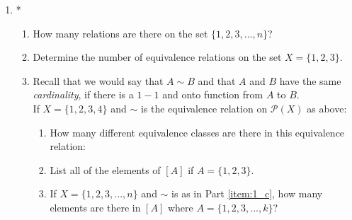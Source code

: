 \documentclass[notoc,notitlepage]{tufte-book}
\begin{document}
\begin{enumerate}
	\item *
    \begin{enumerate}
    \item How many relations are there on the set $\{ 1, 2, 3, ..., n \}$? \\
    \item Determine the number of equivalence relations on the set $X = \{1, 2, 3\}$. \\
    \item Recall that we would say that $A \sim B$ and that $A$ and $B$ have the same \textit{cardinality}, if there is a $1 - 1$ and onto function from $A$ to $B$.\\
      If $X = \{1, 2, 3, 4\}$ and $\sim$ is the equivalence relation on $\mathcal{P}(X)$ as above:\label{item:1_c}
      \begin{enumerate}
        \item How many different equivalence classes are there in this equivalence relation:\\
        \item List all of the elements of $[A]$ if $A = \{1, 2, 3\}$.
        \item If $X = \{1, 2, 3, ..., n\}$ and $\sim$ is as in Part \ref{item:1_c}, how many elements are there in $[A]$ where $A = \{1, 2, 3, ..., k\}$? \\
      \end{enumerate}
	\end{enumerate}


\end{enumerate}
\end{document}
